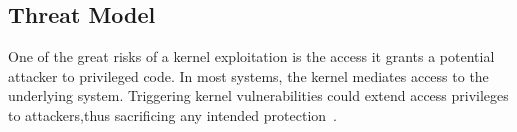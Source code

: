 


\subsection{Threat Model}

One of the great risks of a kernel exploitation is the access
it grants a potential attacker to privileged code. In most systems, the kernel
mediates access to the underlying system. Triggering kernel vulnerabilities
could extend access privileges
to attackers,thus sacrificing any intended protection~\cite{Repy-10}.

